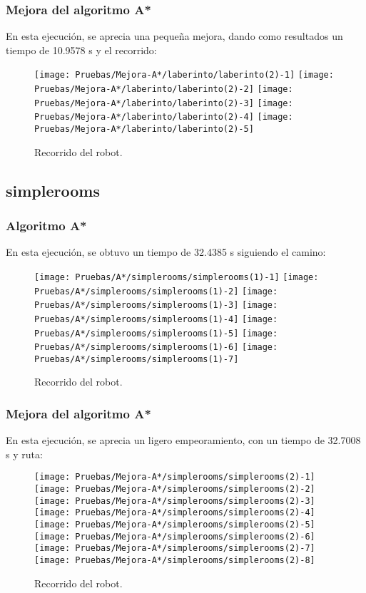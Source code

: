 \documentclass[a4paper, 11pt]{article}
\begin{document}
		\subsubsection{Mejora del algoritmo A*}
			En esta ejecución, se aprecia una pequeña mejora, dando como resultados un tiempo de 10.9578 s
			y el recorrido: 
			
			\begin{figure}[H]
				\centering
				\texttt{[image: Pruebas/Mejora-A*/laberinto/laberinto(2)-1]}
				\texttt{[image: Pruebas/Mejora-A*/laberinto/laberinto(2)-2]}
				\texttt{[image: Pruebas/Mejora-A*/laberinto/laberinto(2)-3]}
				\texttt{[image: Pruebas/Mejora-A*/laberinto/laberinto(2)-4]}
				\texttt{[image: Pruebas/Mejora-A*/laberinto/laberinto(2)-5]}
				\caption{Recorrido del robot.}
				\label{MA-lab}
			\end{figure}
	\subsection{simplerooms}
		\subsubsection{Algoritmo A*}
			En esta ejecución, se obtuvo un tiempo de 32.4385 s siguiendo el camino:
			\begin{figure}[H]
				\centering
				\texttt{[image: Pruebas/A*/simplerooms/simplerooms(1)-1]}
				\texttt{[image: Pruebas/A*/simplerooms/simplerooms(1)-2]}
				\texttt{[image: Pruebas/A*/simplerooms/simplerooms(1)-3]}
				\texttt{[image: Pruebas/A*/simplerooms/simplerooms(1)-4]}
				\texttt{[image: Pruebas/A*/simplerooms/simplerooms(1)-5]}
				\texttt{[image: Pruebas/A*/simplerooms/simplerooms(1)-6]}
				\texttt{[image: Pruebas/A*/simplerooms/simplerooms(1)-7]}
				\caption{Recorrido del robot.}
				\label{A-sim}
			\end{figure}
			
		\subsubsection{Mejora del algoritmo A*}
			En esta ejecución, se aprecia un ligero empeoramiento, con un tiempo de 32.7008 s y ruta: 

			\begin{figure}[H]
				\centering
				\texttt{[image: Pruebas/Mejora-A*/simplerooms/simplerooms(2)-1]}
				\texttt{[image: Pruebas/Mejora-A*/simplerooms/simplerooms(2)-2]}
				\texttt{[image: Pruebas/Mejora-A*/simplerooms/simplerooms(2)-3]}
				\texttt{[image: Pruebas/Mejora-A*/simplerooms/simplerooms(2)-4]}
				\texttt{[image: Pruebas/Mejora-A*/simplerooms/simplerooms(2)-5]}
				\texttt{[image: Pruebas/Mejora-A*/simplerooms/simplerooms(2)-6]}
				\texttt{[image: Pruebas/Mejora-A*/simplerooms/simplerooms(2)-7]}
				\texttt{[image: Pruebas/Mejora-A*/simplerooms/simplerooms(2)-8]}
				\caption{Recorrido del robot.}
				\label{MA-sim}
			\end{figure}
			
\end{document}
